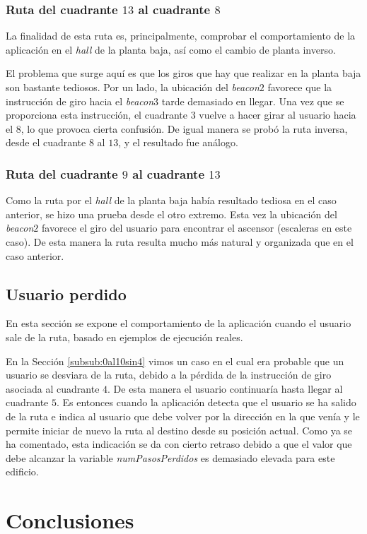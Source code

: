 \subsubsection{Ruta del cuadrante $13$ al cuadrante $8$}

La finalidad de esta ruta es, principalmente, comprobar el comportamiento de la aplicación en el \textit{hall} de la planta baja, así como el cambio de planta inverso. 

El problema que surge aquí es que los giros que hay que realizar en la planta baja son bastante tediosos. Por un lado, la ubicación del \textit{beacon$2$} favorece que la instrucción de giro hacia el \textit{beacon$3$} tarde demasiado en llegar. Una vez que se proporciona esta instrucción, el cuadrante $3$ vuelve a hacer girar al usuario hacia el $8$, lo que provoca cierta confusión. De igual manera se probó la ruta inversa, desde el cuadrante $8$ al $13$, y el resultado fue análogo.


\subsubsection{Ruta del cuadrante $9$ al cuadrante $13$}

Como la ruta por el \textit{hall} de la planta baja había resultado tediosa en el caso anterior, se hizo una prueba desde el otro extremo. Esta vez la ubicación del \textit{beacon$2$} favorece el giro del usuario para encontrar el ascensor (escaleras en este caso). De esta manera la ruta resulta mucho más natural y organizada que en el caso anterior.

\subsection{Usuario perdido}
\label{sub:usuarioPerdido}

En esta sección se expone el comportamiento de la aplicación cuando el usuario sale de la ruta, basado en ejemplos de ejecución reales. 

En la Sección \ref{subsub:0al10sin4} vimos un caso en el cual era probable que un usuario se desviara de la ruta, debido a la pérdida de la instrucción de giro asociada al cuadrante $4$. De esta manera el usuario continuaría hasta llegar al cuadrante $5$. Es entonces cuando la aplicación detecta que el usuario se ha salido de la ruta e indica al usuario que debe volver por la dirección en la que venía y le permite iniciar de nuevo la ruta al destino desde su posición actual. Como ya se ha comentado, esta indicación se da con cierto retraso debido a que el valor que debe alcanzar la variable \textit{numPasosPerdidos} es demasiado elevada para este edificio. 


\section{Conclusiones}


